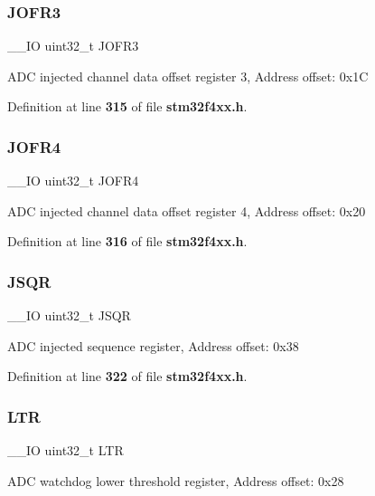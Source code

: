 \subsubsection{J\+O\+F\+R3}
{\footnotesize\ttfamily \+\_\+\+\_\+\+IO uint32\+\_\+t J\+O\+F\+R3}

A\+DC injected channel data offset register 3, Address offset\+: 0x1C 

Definition at line \textbf{ 315} of file \textbf{ stm32f4xx.\+h}.

\mbox{\label{structADC__TypeDef_a2fd59854223e38158b4138ee8e913ab3}} 
\subsubsection{J\+O\+F\+R4}
{\footnotesize\ttfamily \+\_\+\+\_\+\+IO uint32\+\_\+t J\+O\+F\+R4}

A\+DC injected channel data offset register 4, Address offset\+: 0x20 

Definition at line \textbf{ 316} of file \textbf{ stm32f4xx.\+h}.

\mbox{\label{structADC__TypeDef_a75e0cc079831adcc051df456737d3ae4}} 
\subsubsection{J\+S\+QR}
{\footnotesize\ttfamily \+\_\+\+\_\+\+IO uint32\+\_\+t J\+S\+QR}

A\+DC injected sequence register, Address offset\+: 0x38 

Definition at line \textbf{ 322} of file \textbf{ stm32f4xx.\+h}.

\mbox{\label{structADC__TypeDef_a9f8712dfef7125c0bb39db11f2b7416b}} 
\subsubsection{L\+TR}
{\footnotesize\ttfamily \+\_\+\+\_\+\+IO uint32\+\_\+t L\+TR}

A\+DC watchdog lower threshold register, Address offset\+: 0x28 

